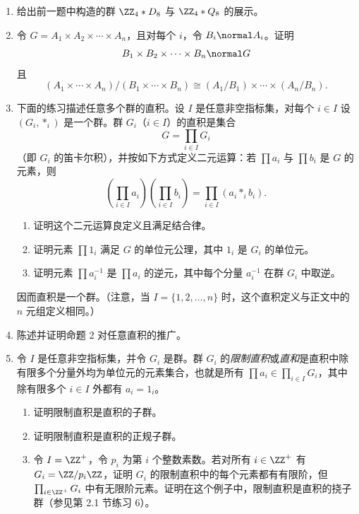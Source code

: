\begin{enumerate}[label=\arabic*.]
  \item 给出前一题中构造的群 $\ZZ_4*D_8$ 与 $\ZZ_4*Q_8$ 的展示。

  \item 令 $G=A_1\times A_2\times\cdots\times A_n$，且对每个 $i$，令 $B_i\normal A_i$。证明
  \[
    B_1\times B_2\times\cdots\times B_n\normal G
  \]
  且
  \[
    (A_1\times\cdots\times A_n)/(B_1\times\cdots\times B_n)
    \cong (A_1/B_1)\times\cdots\times(A_n/B_n).
  \]

  \item 下面的练习描述任意多个群的直积。设 $I$ 是任意非空指标集，对每个 $i\in I$ 设 $(G_i,*_i)$ 是一个群。群 $G_i$（$i\in I$）的直积是集合
  \[
    G=\prod_{i\in I}G_i
  \]
  （即 $G_i$ 的笛卡尔积），并按如下方式定义二元运算：若 $\prod a_i$ 与 $\prod b_i$ 是 $G$ 的元素，则
  \[
    \left(\prod_{i\in I}a_i\right)\left(\prod_{i\in I}b_i\right)
    =\prod_{i\in I}(a_i*_i b_i).
  \]
  \begin{enumerate}[label=(\alph*)]
    \item 证明这个二元运算良定义且满足结合律。
    \item 证明元素 $\prod 1_i$ 满足 $G$ 的单位元公理，其中 $1_i$ 是 $G_i$ 的单位元。
    \item 证明元素 $\prod a_i^{-1}$ 是 $\prod a_i$ 的逆元，其中每个分量 $a_i^{-1}$ 在群 $G_i$ 中取逆。
  \end{enumerate}
  因而直积是一个群。（注意，当 $I=\{1,2,
\ldots,n\}$ 时，这个直积定义与正文中的 $n$ 元组定义相同。）

  \item 陈述并证明命题 2 对任意直积的推广。

  \item 令 $I$ 是任意非空指标集，并令 $G_i$ 是群。群 $G_i$ 的\emph{限制直积}或\emph{直和}是直积中除有限多个分量外均为单位元的元素集合，也就是所有 $\prod a_i\in\prod_{i\in I}G_i$，其中除有限多个 $i\in I$ 外都有 $a_i=1_i$。
  \begin{enumerate}[label=(\alph*)]
    \item 证明限制直积是直积的子群。
    \item 证明限制直积是直积的正规子群。
    \item 令 $I=\ZZ^+$，令 $p_i$ 为第 $i$ 个整数素数。若对所有 $i\in\ZZ^+$ 有 $G_i=\ZZ/p_i\ZZ$，证明 $G_i$ 的限制直积中的每个元素都有有限阶，但 $\prod_{i\in\ZZ^+}G_i$ 中有无限阶元素。证明在这个例子中，限制直积是直积的挠子群（参见第 2.1 节练习 6）。
  \end{enumerate}


\end{enumerate}

